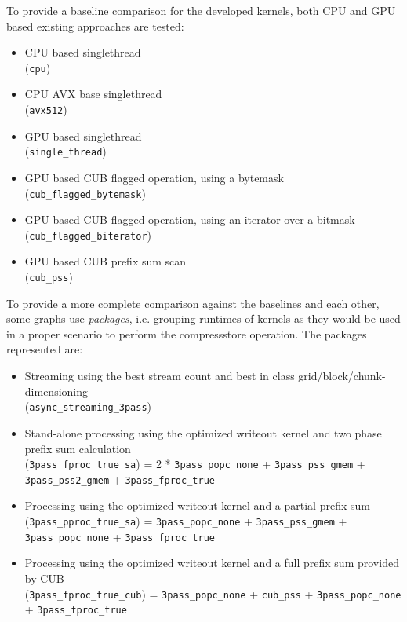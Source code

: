 \documentclass{tudscrreprt}
\begin{document}
			To provide a baseline comparison for the developed kernels, both CPU and GPU based existing approaches are tested:
			\begin{itemize}
				\item CPU based singlethread \\ (\texttt{cpu})
				\item CPU AVX base singlethread \\ (\texttt{avx512})
				\item GPU based singlethread \\ (\texttt{single\_thread})
				\item GPU based CUB flagged operation, using a bytemask \\ (\texttt{cub\_flagged\_bytemask})
				\item GPU based CUB flagged operation, using an iterator over a bitmask \\ (\texttt{cub\_flagged\_biterator})
				\item GPU based CUB prefix sum scan \\ (\texttt{cub\_pss})
			\end{itemize}
			
			To provide a more complete comparison against the baselines and each other, some graphs use \emph{packages}, i.e. grouping runtimes of kernels as they would be used in a proper scenario to perform the compressstore operation. The packages represented are:
			\begin{itemize}
				\item Streaming using the best stream count and best in class grid/block/chunk-dimensioning \\ (\texttt{async\_streaming\_3pass})
				\item Stand-alone processing using the optimized writeout kernel and two phase prefix sum calculation \\ (\texttt{3pass\_fproc\_true\_sa})
					\subitem = 2 * \texttt{3pass\_popc\_none} + \texttt{3pass\_pss\_gmem} + \texttt{3pass\_pss2\_gmem} + \texttt{3pass\_fproc\_true}
				\item Processing using the optimized writeout kernel and a partial prefix sum \\ (\texttt{3pass\_pproc\_true\_sa})
					\subitem = \texttt{3pass\_popc\_none} + \texttt{3pass\_pss\_gmem} + \texttt{3pass\_popc\_none} + \texttt{3pass\_fproc\_true}
				\item Processing using the optimized writeout kernel and a full prefix sum provided by CUB \\ (\texttt{3pass\_fproc\_true\_cub})
					\subitem = \texttt{3pass\_popc\_none} + \texttt{cub\_pss} + \texttt{3pass\_popc\_none} + \texttt{3pass\_fproc\_true}
			\end{itemize}
	
\end{document}
